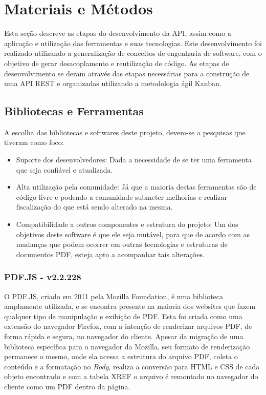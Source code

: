 \chapter{Materiais e Métodos}

Esta seção descreve as etapas do desenvolvimento da API, assim como a aplicação e utilização das ferramentas e suas tecnologias. Este desenvolvimento foi realizado utilizando a generalização de conceitos de engenharia de software, com o objetivo de gerar desacoplamento e reutilização de código. As etapas de desenvolvimento se deram através das etapas necessárias para a construção de uma API REST e organizadas utilizando a metodologia ágil Kanban.

\section{Bibliotecas e Ferramentas}

A escolha das bibliotecas e softwares deste projeto, devem-se a pesquisas que tiveram como foco: 
\begin{itemize}
    \item Suporte dos desenvolvedores: Dada a necessidade de se ter uma ferramenta que seja confiável e atualizada.
    \item Alta utilização pela comunidade: Já que a maioria destas ferramentas são de código livre e podendo a comunidade submeter melhorias e realizar fiscalização do que está sendo alterado na mesma.
    \item Compatibilidade a outros componentes e estrutura do projeto: Um dos objetivos deste software é que ele seja mutável, para que de acordo com as mudanças que podem ocorrer em outras tecnologias e estruturas de documentos PDF, esteja apto a acompanhar tais alterações.
\end{itemize}

\subsection{PDF.JS - v2.2.228}

O PDF.JS, criado em 2011 pela Mozilla Foundation, é uma biblioteca amplamente utilizada, e se encontra presente na maioria dos websites que fazem qualquer tipo de manipulação e exibição de PDF. Esta foi criada como uma extensão do navegador Firefox, com a intenção de renderizar arquivos PDF, de forma rápida e segura, no navegador do cliente. Apesar da migração de uma biblioteca específica para o navegador da Mozilla, seu formato de renderização permanece o mesmo, onde ela acessa a estrutura do arquivo PDF, coleta o conteúdo e a formatação no \textit{Body}, realiza a conversão para HTML e CSS de cada objeto encontrado e com a tabela XREF o arquivo é remontado no navegador do cliente como um PDF dentro da página.

